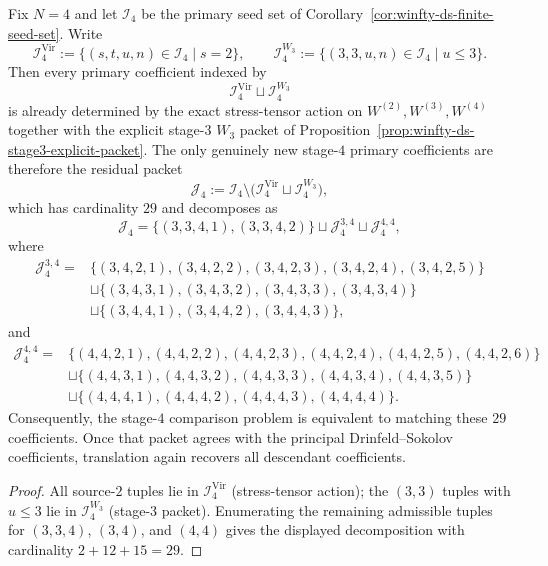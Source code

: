 \begin{proposition}
\label{prop:winfty-ds-stage4-residual-packet}
Fix $N=4$ and let $\mathcal{I}_4$ be the primary seed set of
Corollary~\ref{cor:winfty-ds-finite-seed-set}.  Write
\[
\mathcal{I}_4^{\mathrm{Vir}}
:=\{(s,t,u,n)\in\mathcal{I}_4 \mid s=2\},
\qquad
\mathcal{I}_4^{W_3}
:=\{(3,3,u,n)\in\mathcal{I}_4 \mid u\le 3\}.
\]
Then every primary coefficient indexed by
\[
\mathcal{I}_4^{\mathrm{Vir}}\sqcup \mathcal{I}_4^{W_3}
\]
is already determined by the exact stress-tensor action on
$W^{(2)},W^{(3)},W^{(4)}$ together with the explicit stage-$3$
\texorpdfstring{$W_3$}{W3} packet of
Proposition~\ref{prop:winfty-ds-stage3-explicit-packet}.  The only
genuinely new stage-$4$ primary coefficients are therefore the residual
packet
\[
\mathcal{J}_4
:=\mathcal{I}_4\setminus
\bigl(\mathcal{I}_4^{\mathrm{Vir}}\sqcup \mathcal{I}_4^{W_3}\bigr),
\]
which has cardinality $29$ and decomposes as
\[
\mathcal{J}_4
=\{(3,3,4,1),(3,3,4,2)\}
\sqcup \mathcal{J}_4^{3,4}
\sqcup \mathcal{J}_4^{4,4},
\]
where
\begin{align*}
\mathcal{J}_4^{3,4}
={} & \{(3,4,2,1),(3,4,2,2),(3,4,2,3),(3,4,2,4),(3,4,2,5)\} \\
& \sqcup \{(3,4,3,1),(3,4,3,2),(3,4,3,3),(3,4,3,4)\} \\
& \sqcup \{(3,4,4,1),(3,4,4,2),(3,4,4,3)\},
\end{align*}
and
\begin{align*}
\mathcal{J}_4^{4,4}
={} & \{(4,4,2,1),(4,4,2,2),(4,4,2,3),(4,4,2,4),(4,4,2,5),(4,4,2,6)\} \\
& \sqcup \{(4,4,3,1),(4,4,3,2),(4,4,3,3),(4,4,3,4),(4,4,3,5)\} \\
& \sqcup \{(4,4,4,1),(4,4,4,2),(4,4,4,3),(4,4,4,4)\}.
\end{align*}
Consequently, the stage-$4$ comparison problem is equivalent to
matching these $29$ coefficients.  Once that packet agrees with the
principal Drinfeld--Sokolov coefficients, translation again recovers
all descendant coefficients.
\end{proposition}

\begin{proof}
All source-$2$ tuples lie in $\mathcal{I}_4^{\mathrm{Vir}}$ (stress-tensor action); the $(3,3)$ tuples with $u\le 3$ lie in $\mathcal{I}_4^{W_3}$ (stage-$3$ packet).  Enumerating the remaining admissible tuples for $(3,3,4)$, $(3,4)$, and $(4,4)$ gives the displayed decomposition with cardinality $2+12+15=29$.
\end{proof}

